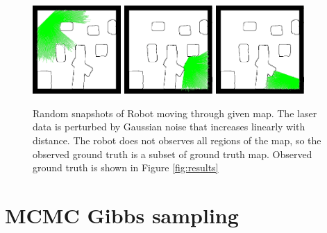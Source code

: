 \documentclass[10pt,oneside,letterpaper]{article}
\begin{document}
\begin{figure}
  \includegraphics[width=0.3\textwidth]{figures/input-start.png}
  \includegraphics[width=0.3\textwidth]{figures/input-mid.png}
  \includegraphics[width=0.3\textwidth]{figures/input-last.png}
  \caption{Random snapshots of Robot moving through given map. The laser data is perturbed by Gaussian noise that increases linearly with distance. The robot does not observes all regions of the map, so the observed ground truth is a subset of ground truth map. Observed ground truth is shown in Figure \ref{fig:results}}
  \label{fig:input}
\end{figure}
% 

\section{MCMC Gibbs sampling }
\end{document}
